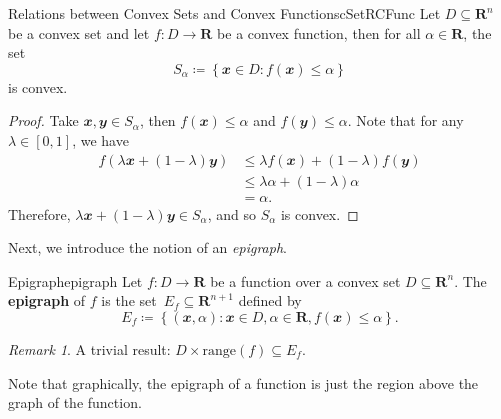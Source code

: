 \documentclass[math]{amznotes}
\theoremstyle{remark}
\newtheorem*{remark}{Remark}
\begin{document}
\begin{probox}{Relations between Convex Sets and Convex Functions}{cSetRCFunc}
    Let $D \subseteq \mathbf{R}^n$ be a convex set and let $f \colon D \to \mathbf{R}$ be a convex function, then for all $\alpha \in \mathbf{R}$, the set
    \begin{displaymath}
        S_\alpha \coloneqq \left\{\mathbfit{x} \in D \colon f(\mathbfit{x}) \leq \alpha\right\}
    \end{displaymath}
    is convex.
    \tcblower   
    \begin{proof}
        Take $\mathbfit{x}, \mathbfit{y} \in S_\alpha$, then $f(\mathbfit{x}) \leq \alpha$ and $f(\mathbfit{y}) \leq \alpha$. Note that for any $\lambda \in [0, 1]$, we have
        \begin{align*}
            f\left(\lambda\mathbfit{x} + (1 - \lambda)\mathbfit{y}\right) & \leq \lambda f(\mathbfit{x}) + (1 - \lambda)f(\mathbfit{y}) \\
            & \leq \lambda\alpha + (1 - \lambda)\alpha \\
            & = \alpha.
        \end{align*}
        Therefore, $\lambda\mathbfit{x} + (1 - \lambda)\mathbfit{y} \in S_\alpha$, and so $S_\alpha$ is convex.
    \end{proof}
\end{probox}
Next, we introduce the notion of an \textit{epigraph}.
\begin{dfnbox}{Epigraph}{epigraph}
    Let $f \colon D \to \mathbf{R}$ be a function over a convex set $D \subseteq \mathbf{R}^n$. The {\color{red} \textbf{epigraph}} of $f$ is the set~$E_f \subseteq \mathbf{R}^{n + 1}$ defined by
    \begin{displaymath}
        E_f \coloneqq \left\{(\mathbfit{x}, \alpha) \colon \mathbfit{x} \in D, \alpha \in \mathbf{R}, f(\mathbfit{x}) \leq \alpha\right\}.
    \end{displaymath}
\end{dfnbox}
\begin{notebox}
    \begin{remark}
        A trivial result: $D \times \mathrm{range}(f) \subseteq E_f$.
    \end{remark}
\end{notebox}
Note that graphically, the epigraph of a function is just the region above the graph of the function.
\end{document}
